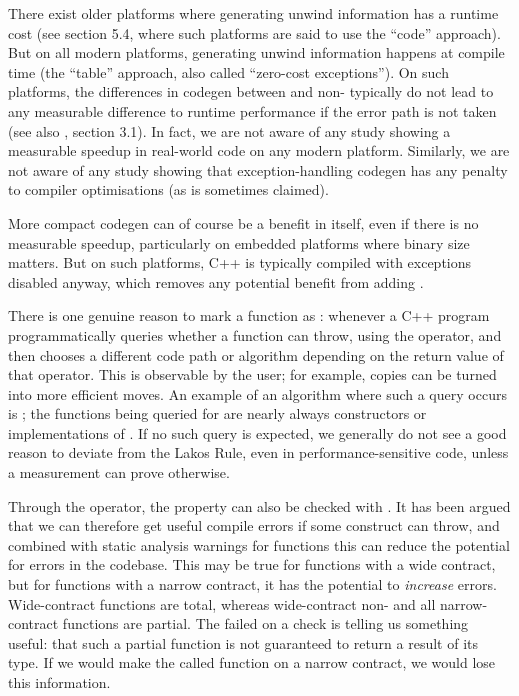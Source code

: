 There exist older platforms where generating unwind information has a runtime cost (see \cite{TR18015} section 5.4, where such platforms are said to use the ``code'' approach). But on all modern platforms, generating unwind information happens at compile time (the ``table'' approach, also called ``zero-cost exceptions''). On such platforms, the differences in codegen between  and non- typically do not lead to any measurable difference to runtime performance if the error path is not taken (see also \cite{EMC++S}, section 3.1). In fact, we are not aware of any study showing a measurable speedup in real-world code on any modern platform. Similarly, we are not aware of any study showing that exception-handling codegen has any penalty to compiler optimisations (as is sometimes claimed).

More compact codegen can of course be a benefit in itself, even if there is no measurable speedup, particularly on embedded platforms where binary size matters. But on such platforms, C++ is typically compiled with exceptions disabled anyway, which removes any potential benefit from adding .

There is one genuine reason to mark a function as : whenever a C++ program programmatically queries whether a function can throw, using the  operator, and then chooses a different code path or algorithm depending on the return value of that operator. This is observable by the user; for example, copies can be turned into more efficient moves. An example of an algorithm where such a query occurs is ; the functions being queried for  are nearly always constructors or implementations of . If no such query is expected, we generally do not see a good reason to deviate from the Lakos Rule, even in performance-sensitive code, unless a measurement can prove otherwise.

Through the  operator, the  property can also be checked with . It has been argued that we can therefore get useful compile errors if some construct can throw, and combined with static analysis warnings for  functions this can reduce the potential for errors in the codebase. This may be true for functions with a wide contract, but for functions with a narrow contract, it has the potential to \emph{increase} errors. Wide-contract  functions are total, whereas wide-contract non- and all narrow-contract functions are partial. The failed  on a  check is telling us something useful: that such a partial function is not guaranteed to return a result of its type. If we would make the called function  on a narrow contract, we would lose this information.

